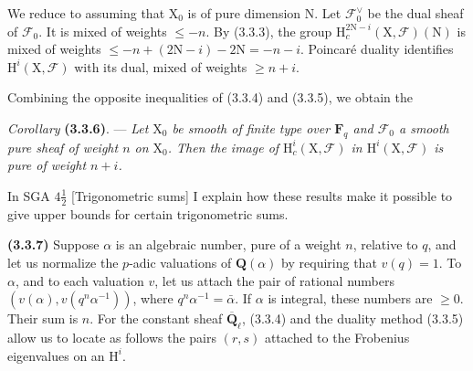 \documentclass[11pt,leqno]{article}
\begin{document}
We reduce to assuming that \(\mathrm{X}_0\) is of pure dimension \(\mathrm{N}\). Let \(\mathscr{F}_0^\vee\) be the dual sheaf of \(\mathscr{F}_0\). It is mixed of weights \(\leq-n\). By (3.3.3), the group \(\mathrm{H}_c^{2\mathrm{N}-i}(\mathrm{X},\mathscr{F})(\mathrm{N})\) is mixed of weights \(\leq-n+(2\mathrm{N}-i)-2\mathrm{N}=-n-i\). Poincaré duality identifies \(\mathrm{H}^i(\mathrm{X},\mathscr{F})\) with its dual, mixed of weights \(\geq n+i\).

Combining the opposite inequalities of (3.3.4) and (3.3.5), we obtain the

\textit{Corollary} \textbf{(3.3.6)}. — \textit{Let \(\mathrm{X}_0\) be smooth of finite type over \(\mathbf{F}_q\) and \(\mathscr{F}_0\) a smooth pure sheaf of weight \(n\) on \(\mathrm{X}_0\). Then the image of \(\mathrm{H}_c^i(\mathrm{X},\mathscr{F})\) in \(\mathrm{H}^i(\mathrm{X},\mathscr{F})\) is pure of weight \(n+i\).}

In SGA \(4\frac{1}{2}\) [Trigonometric sums] I explain how these results make it possible to give upper bounds for certain trigonometric sums.

\textbf{(3.3.7)} Suppose \(\alpha\) is an algebraic number, pure of a weight \(n\), relative to \(q\), and let us normalize the \(p\)-adic valuations of \(\mathbf{Q}(\alpha)\) by requiring that \(v(q)=1\). To \(\alpha\), and to each valuation \(v\), let us attach the pair of rational numbers \((v(\alpha),v(q^n\alpha^{-1}))\), where \(q^n\alpha^{-1}=\bar{\alpha}\). If \(\alpha\) is integral, these numbers are \(\geq0\). Their sum is \(n\). For the constant sheaf \(\overline{\mathbf{Q}}_\ell\), (3.3.4) and the duality method (3.3.5) allow us to locate as follows the pairs \((r,s)\) attached to the Frobenius eigenvalues on an \(\mathrm{H}^i\).
\end{document}
